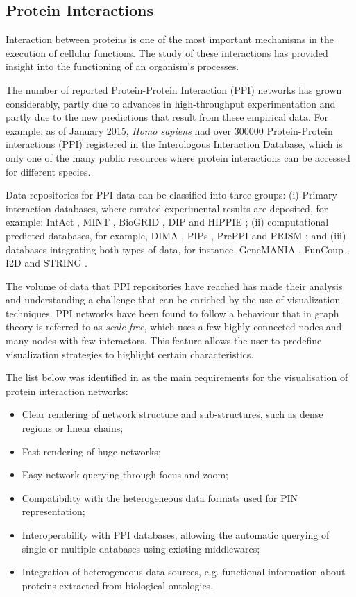 \subsection{Protein Interactions}
\label{sec:ppi}
Interaction between proteins is one of the most important mechanisms in the execution of cellular functions. The study of these interactions has provided insight into the functioning of an organism's processes.

The number of reported Protein-Protein Interaction (PPI) networks has grown considerably, partly due to advances in high-throughput experimentation and partly due to the new predictions that result from these empirical data. For example, as of January 2015, \emph{Homo sapiens} had over 300000 Protein-Protein interactions (PPI) registered in the Interologous Interaction Database, which is only one of the many public resources where protein interactions can be accessed for different species. 

Data repositories for PPI data can be classified into three groups: (i) Primary interaction databases, where curated experimental results are deposited, for example: IntAct \cite{KER2012}, MINT \cite{LIC2012}, BioGRID \cite{STA2006}, DIP \cite{SAL2004} and HIPPIE \cite{SCH2012}; (ii) computational predicted databases, for example, DIMA \cite{LUO2011}, PIPs \cite{MCD2009}, PrePPI \cite{ZHA2012} and PRISM \cite{OGM2005}; and (iii) databases integrating both types of data, for instance, GeneMANIA \cite{WAR2010}, FunCoup \cite{SCH2014}, I2D \cite{NIU2010} and STRING \cite{SZK2014}.

The volume of data that PPI repositories have reached has made their analysis and understanding a challenge that can be enriched by the use of visualization techniques. PPI networks have been found to follow a behaviour that in graph theory is referred to as \emph{scale-free}, which uses a few highly connected nodes and many nodes with few interactors. This feature allows the user to predefine visualization strategies to highlight certain characteristics.

The list below was identified in \cite{AGA2013} as the main requirements for the visualisation of protein interaction networks:
\begin{itemize}
\setlength\itemsep{-0.3em}
        \item Clear rendering of network structure and sub-structures, such as dense regions or linear chains;
        \item Fast rendering of huge networks;
        \item Easy network querying through focus and zoom;
        \item Compatibility with the heterogeneous data formats used for PIN representation;
        \item Interoperability with PPI databases, allowing the automatic querying of single or multiple databases using existing middlewares;
        \item Integration of heterogeneous data sources, e.g. functional information about proteins extracted from biological ontologies.
\end{itemize}

